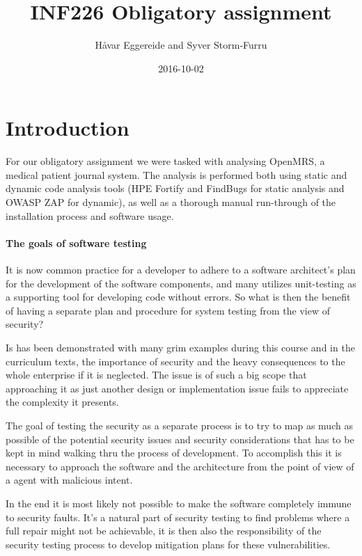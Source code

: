 \documentclass{article}
\title{INF226 Obligatory assignment}
\date{2016-10-02}
\author{Håvar Eggereide and Syver Storm-Furru}
\begin{document}
\maketitle
{}
\newpage
{}
\tableofcontents
\newpage
\section{Introduction}

  For our obligatory assignment we were tasked with analysing OpenMRS, a medical
  patient journal system. The analysis is performed both using static and
  dynamic code analysis tools (HPE Fortify and FindBugs for static analysis and
  OWASP ZAP for dynamic), as well as a thorough manual run-through of the installation
  process and software usage.

  \paragraph{The goals of software testing}

  It is now common practice  for a developer to adhere to a software architect's
  plan for the development of the software components, and many utilizes
  unit-testing as a supporting tool for developing code without errors. So what
  is then the benefit of having a separate plan and procedure for system testing
  from the view of security?

  Is has been demonstrated with many grim examples during this course and in the
  curriculum texts, the importance of security and the heavy consequences to the
  whole enterprise if it is neglected. The issue is of such a big scope that
  approaching it as just another design or implementation issue fails to
  appreciate the complexity it presents.

  The goal of testing the security as a separate process is to try to map as
  much as possible of the potential security issues and security considerations
  that has to be kept in mind walking thru the process of development. To
  accomplish this it is necessary to approach the software and the architecture
  from the point of view of a agent with malicious intent.

  In the end it is  most likely not possible to make the software completely
  immune to security faults. It's a natural part of security testing to find
  problems where a full repair might not be achievable, it is then also the
  responsibility of the security testing process to develop mitigation plans for
  these vulnerabilities.
\end{document}
